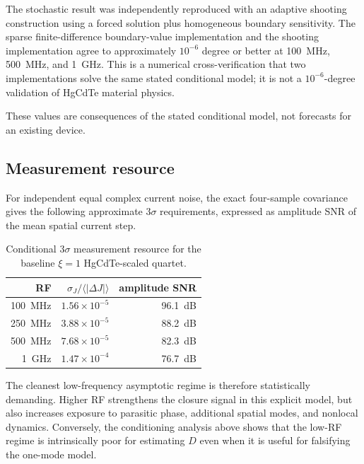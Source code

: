 \documentclass[11pt]{article}
\begin{document}
The stochastic result was independently reproduced with an adaptive shooting construction using a forced solution plus homogeneous boundary sensitivity. The sparse finite-difference boundary-value implementation and the shooting implementation agree to approximately $10^{-6}$ degree or better at \SI{100}{MHz}, \SI{500}{MHz}, and \SI{1}{GHz}. This is a numerical cross-verification that two implementations solve the same stated conditional model; it is not a $10^{-6}$-degree validation of HgCdTe material physics.

These values are consequences of the stated conditional model, not forecasts for an existing device.

\subsection{Measurement resource}

For independent equal complex current noise, the exact four-sample covariance gives the following approximate $3\sigma$ requirements, expressed as amplitude SNR of the mean spatial current step.
\begin{table}[H]
\centering
\caption{Conditional $3\sigma$ measurement resource for the baseline $\xi=1$ HgCdTe-scaled quartet.}
\begin{tabular}{rrr}
\toprule
RF & $\sigma_J/\langle|\Delta J|\rangle$ & amplitude SNR \\
\midrule
\SI{100}{MHz} & $1.56\times10^{-5}$ & \SI{96.1}{dB} \\
\SI{250}{MHz} & $3.88\times10^{-5}$ & \SI{88.2}{dB} \\
\SI{500}{MHz} & $7.68\times10^{-5}$ & \SI{82.3}{dB} \\
\SI{1}{GHz} & $1.47\times10^{-4}$ & \SI{76.7}{dB} \\
\bottomrule
\end{tabular}
\end{table}
The cleanest low-frequency asymptotic regime is therefore statistically demanding. Higher RF strengthens the closure signal in this explicit model, but also increases exposure to parasitic phase, additional spatial modes, and nonlocal dynamics. Conversely, the conditioning analysis above shows that the low-RF regime is intrinsically poor for estimating $D$ even when it is useful for falsifying the one-mode model.
\end{document}
